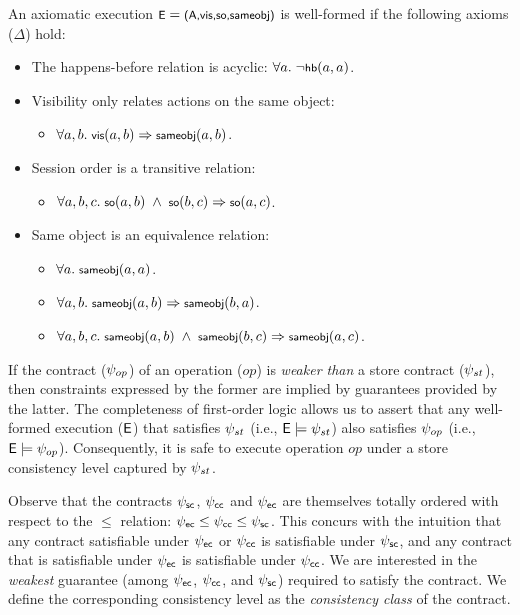 \begin{definition}
An axiomatic execution $\small \E = \Exec$ is well-formed if the
following axioms ($\Delta$) hold:

\begin{itemize}[noitemsep]
\item The happens-before relation is acyclic: $\small \forall a.~\neg\hb{a}{a}$.
\item Visibility only relates actions on the same object:
	\begin{itemize}
	\item $\small \forall a,b.~\vis{a}{b} \Rightarrow \sameobj{a}{b}$.
	\end{itemize}
\item Session order is a transitive relation:
	\begin{itemize}
	\item $\small \forall a,b,c.~\so{a}{b} ~\wedge~ \so{b}{c} \Rightarrow \so{a}{c}$.
	\end{itemize}
\item Same object is an equivalence relation:
	\begin{itemize}
	\item $\small \forall a.~\sameobj{a}{a}$.
	\item $\small \forall a,b.~\sameobj{a}{b} \Rightarrow \sameobj{b}{a}$.
	\item $\small \forall a,b,c.~\sameobj{a}{b} ~\wedge~ \sameobj{b}{c} \Rightarrow \sameobj{a}{c}$.
	\end{itemize}
\end{itemize}
\end{definition}

If the contract ($\psi_{op}$) of an operation ($\mathit{op}$) is \emph{weaker
than} a store contract ($\psi_{st}$), then constraints expressed by the former
are implied by guarantees provided by the latter. The completeness of
first-order logic allows us to assert that any well-formed execution (${\normalfont \textsf{E}}$)
that satisfies $\psi_{st}$ (i.e., ${\normalfont \textsf{E}}\models \psi_{st}$) also satisfies
$\psi_{op}$ (i.e., ${\normalfont \textsf{E}} \models \psi_{op}$). Consequently, it is safe to execute
operation $\mathit{op}$ under a store consistency level captured by $\psi_{st}$.

Observe that the contracts $\psi_{\sf sc}$, $\psi_{\sf cc}$ and $\psi_{\sf ec}$ are themselves totally
ordered with respect to the $\le$ relation: $\psi_{\sf ec} \le \psi_{\sf cc} \le \psi_{\sf sc}$.  This
concurs with the intuition that any contract satisfiable under $\psi_{\sf ec}$ or $\psi_{\sf cc}$
is satisfiable under $\psi_{\sf sc}$, and any contract that is satisfiable under $\psi_{\sf ec}$
is satisfiable under $\psi_{\sf cc}$. We are interested in the \emph{weakest} guarantee
(among $\psi_{\sf ec}$, $\psi_{\sf cc}$, and $\psi_{\sf sc}$) required to satisfy the contract. We define
the corresponding consistency level as the \emph{consistency class} of the
contract.

